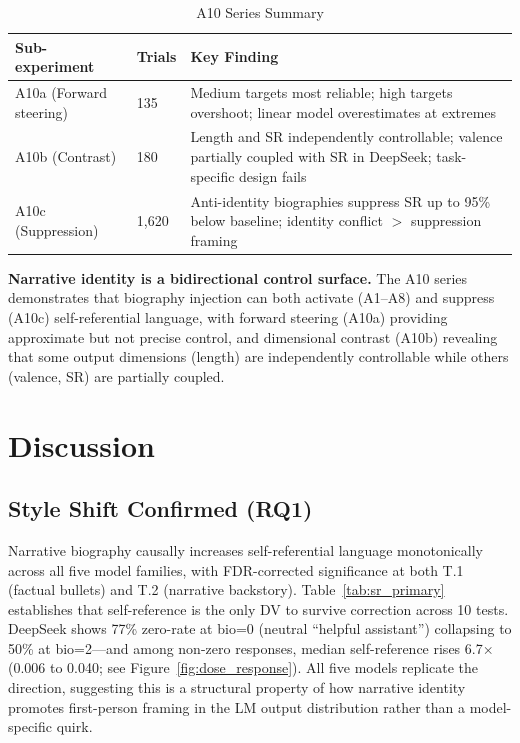 \documentclass[11pt,a4paper]{article}
\begin{document}
\begin{table}[H]
\centering
\caption{A10 Series Summary}
\label{tab:a10_summary}
\begin{tabular}{lll}
\toprule
\textbf{Sub-experiment} & \textbf{Trials} & \textbf{Key Finding} \\
\midrule
A10a (Forward steering) & 135 & Medium targets most reliable; high targets overshoot; linear model overestimates at extremes \\
A10b (Contrast) & 180 & Length and SR independently controllable; valence partially coupled with SR in DeepSeek; task-specific design fails \\
A10c (Suppression) & 1,620 & Anti-identity biographies suppress SR up to 95\% below baseline; identity conflict $>$ suppression framing \\
\bottomrule
\end{tabular}
\end{table}

\textbf{Narrative identity is a bidirectional control surface.} The A10 series demonstrates that biography injection can both activate (A1--A8) and suppress (A10c) self-referential language, with forward steering (A10a) providing approximate but not precise control, and dimensional contrast (A10b) revealing that some output dimensions (length) are independently controllable while others (valence, SR) are partially coupled.

\section{Discussion}
\label{sec:discussion}

\subsection{Style Shift Confirmed (RQ1)}

Narrative biography causally increases self-referential language monotonically across all five model families, with FDR-corrected significance at both T.1 (factual bullets) and T.2 (narrative backstory). Table~\ref{tab:sr_primary} establishes that self-reference is the only DV to survive correction across 10 tests. DeepSeek shows 77\% zero-rate at bio=0 (neutral ``helpful assistant'') collapsing to 50\% at bio=2---and among non-zero responses, median self-reference rises 6.7$\times$ (0.006 to 0.040; see Figure~\ref{fig:dose_response}). All five models replicate the direction, suggesting this is a structural property of how narrative identity promotes first-person framing in the LM output distribution rather than a model-specific quirk.
\end{document}
